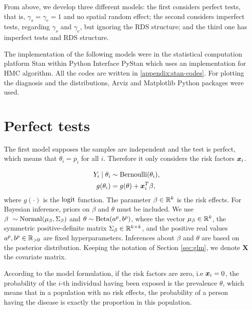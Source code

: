 From above, we develop three different models: the first considers perfect 
tests, that is, $\gamma_s = \gamma_e = 1$ and no spatial random effect; 
the second considers imperfect tests, regarding $\gamma_s$ and $\gamma_e$, 
but ignoring the RDS structure; and the third one has imperfect tests and 
RDS structure. 

The implementation of the following models were in the statistical computation
platform Stan \cite{carpenter2017stan} within Python Interface PyStan
\cite{pystan} which uses an implementation for HMC algorithm. All the codes
are written in \autoref{appendix:stan-codes}. For plotting the diagnosis and 
the distributions, Arviz \cite{arviz_2019} and Matplotlib \cite{Hunter_2007}
Python packages were used. 

\section{Perfect tests}

The first model supposes the samples are independent and the test is perfect,
which means that $\theta_i = p_i$ for all $i$. Therefore it only considers the risk factors $\boldsymbol{x}_i$. 

\begin{equation}
  \label{model:perfect-tests}
  \begin{aligned}
    Y_i \mid \theta_i &\sim \operatorname{Bernoulli}(\theta_i), \\
    g(\theta_i) &= g(\theta) + \boldsymbol{x}_i^T\beta, 
  \end{aligned}  
\end{equation}
where $g(\cdot)$ is the $\operatorname{logit}$ function.
The parameter $\beta \in \mathbb{R}^{k}$ is the risk effects. For Bayesian inference, priors on
$\beta$ and $\theta$ must be included. We use $\beta ~ \sim \operatorname{Normal}(\mu_{\beta}, \Sigma_{\beta})$
and $\theta \sim \operatorname{Beta}(a^{p}, b^p)$, where the vector $\mu_{\beta}
\in \mathbb{R}^{k}$, the symmetric positive-definite matrix $\Sigma_{\beta} \in
\mathbb{R}^{k\times k}$, and the positive real values $a^p, b^p \in \mathbb{R}_{>0}$ are fixed
hyperparameters. Inferences about $\beta$ and $\theta$ are based on the
posterior distribution. Keeping the notation of
Section \ref{sec:glm}, we denote $\boldsymbol{X}$ the covariate matrix. 

\begin{remark}
  \label{remark:interpretation-prevalence}
  According to the model formulation, if the risk factors are zero, i.e $\boldsymbol{x}_i
  = 0$, the probability of the $i$-th individual having been exposed is the prevalence $\theta$, which means that in
a population with no risk effects, the probability of a person having the
disease is exactly the proportion in this population. 
\end{remark}

